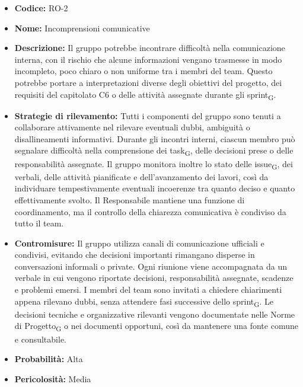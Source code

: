 \documentclass[a4paper, 10pt, colorlinks=true, linkcolor=black, urlcolor=blue, citecolor=blue, hidelinks]{article}
\begin{document}
\begin{itemize}
    \item \textbf{Codice:} RO-2

    \item \textbf{Nome:} Incomprensioni comunicative

    \item \textbf{Descrizione:} Il gruppo potrebbe incontrare difficoltà nella comunicazione interna, con il rischio che alcune informazioni vengano trasmesse in modo incompleto, poco chiaro o non uniforme tra i membri del team. Questo potrebbe portare a interpretazioni diverse degli obiettivi del progetto, dei requisiti del capitolato C6 o delle attività assegnate durante gli sprint\textsubscript{G}. 

    \item \textbf{Strategie di rilevamento:} Tutti i componenti del gruppo sono tenuti a collaborare attivamente nel rilevare eventuali dubbi, ambiguità o disallineamenti informativi. Durante gli incontri interni, ciascun membro può segnalare difficoltà nella comprensione dei task\textsubscript{G}, delle decisioni prese o delle responsabilità assegnate. Il gruppo monitora inoltre lo stato delle issue\textsubscript{G}, dei verbali, delle attività pianificate e dell'avanzamento dei lavori, così da individuare tempestivamente eventuali incoerenze tra quanto deciso e quanto effettivamente svolto. Il Responsabile mantiene una funzione di coordinamento, ma il controllo della chiarezza comunicativa è condiviso da tutto il team.

    \item \textbf{Contromisure:} Il gruppo utilizza canali di comunicazione ufficiali e condivisi, evitando che decisioni importanti rimangano disperse in conversazioni informali o private. Ogni riunione viene accompagnata da un verbale in cui vengono riportate decisioni, responsabilità assegnate, scadenze e problemi emersi. I membri del team sono invitati a chiedere chiarimenti appena rilevano dubbi, senza attendere fasi successive dello sprint\textsubscript{G}. Le decisioni tecniche e organizzative rilevanti vengono documentate nelle Norme di Progetto\textsubscript{G} o nei documenti opportuni, così da mantenere una fonte comune e consultabile.

    \item \textbf{Probabilità:} Alta

    \item \textbf{Pericolosità:} Media
\end{itemize}
\end{document}
